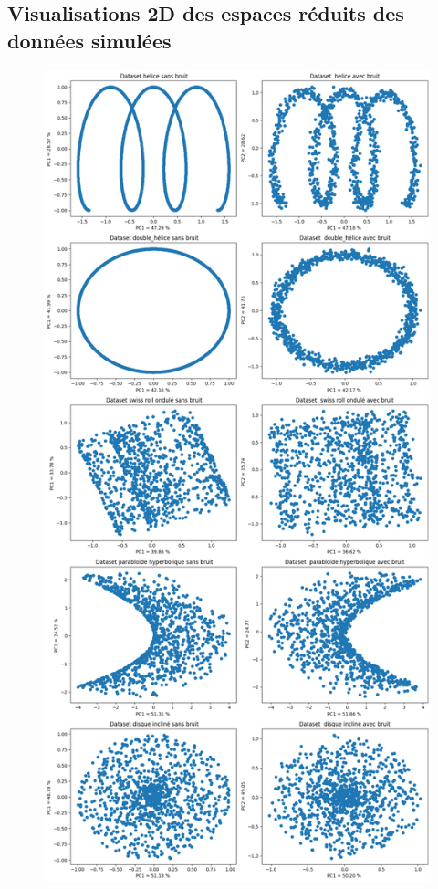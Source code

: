 \documentclass[unnumsec,webpdf,modern,large]{projet_manifold}%
\theoremstyle{thmstyleone}%
\theoremstyle{thmstyletwo}%
\theoremstyle{thmstylethree}%
\begin{document}


\begin{appendices}

\appendixpage

\section{Visualisations 2D des espaces réduits des données simulées}


\thispagestyle{empty}
\vspace*{\fill}  %
\begin{figure}[b]  %
    \centering
    \includegraphics[width=\textwidth,height=0.8\textheight,keepaspectratio]{PCA.png}

\end{figure}
\end{appendices}
\end{document}
